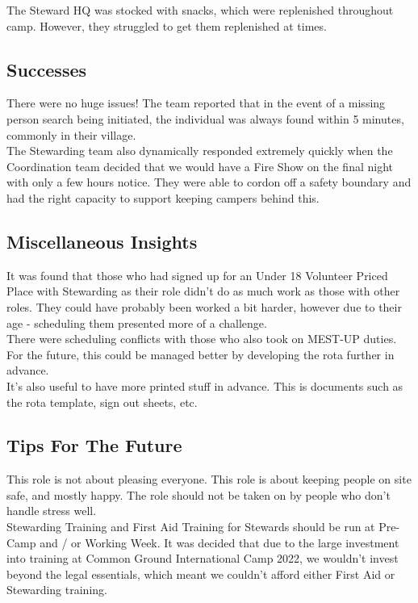 The Steward HQ was stocked with snacks, which were replenished throughout camp. However, they struggled to get them replenished at times.

\subsection{Successes}
There were no huge issues! The team reported that in the event of a missing person search being initiated, the individual was always found within 5 minutes, commonly in their village. \\

The Stewarding team also dynamically responded extremely quickly when the Coordination team decided that we would have a Fire Show on the final night with only a few hours notice. They were able to cordon off a safety boundary and had the right capacity to support keeping campers behind this.

\subsection{Miscellaneous Insights}
It was found that those who had signed up for an Under 18 Volunteer Priced Place with Stewarding as their role didn't do as much work as those with other roles. They could have probably been worked a bit harder, however due to their age - scheduling them presented more of a challenge. \\

There were scheduling conflicts with those who also took on MEST-UP duties. For the future, this could be managed better by developing the rota further in advance.\\

It's also useful to have more printed stuff in advance. This is documents such as the rota template, sign out sheets, etc.

\subsection{Tips For The Future}
This role is not about pleasing everyone. This role is about keeping people on site safe, and mostly happy. The role should not be taken on by people who don't handle stress well.\\

Stewarding Training and First Aid Training for Stewards should be run at Pre-Camp and / or Working Week. It was decided that due to the large investment into training at Common Ground International Camp 2022, we wouldn't invest beyond the legal essentials, which meant we couldn't afford either First Aid or Stewarding training.\\

